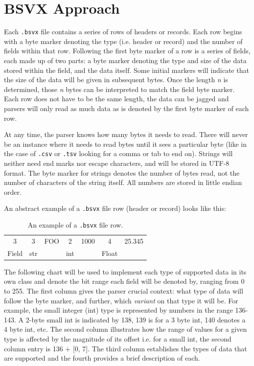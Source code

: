 \documentclass[10pt]{article}
\begin{document}
\section*{BSVX Approach}

Each \texttt{.bsvx} file contains a series of rows of headers or records.
Each row begins with a byte marker denoting the type (i.e. header or record) and the number of fields within that row.
Following the first byte marker of a row is a series of fields, each made up of two parts: a byte marker denoting the type and size of the data stored within the field, and the data itself.
Some initial markers will indicate that the size of the data will be given in subsequent bytes.
Once the length \textit{n} is determined, those \textit{n} bytes can be interpreted to match the field byte marker.
Each row does not have to be the same length, the data can be jagged and parsers will only read as much data as is denoted by the first byte marker of each row. 

\indent{}
At any time, the parser knows how many bytes it needs to read.
There will never be an instance where it needs to read bytes until it sees a particular byte (like in the case of \texttt{.csv} or \texttt{.tsv} looking for a comma or tab to end on).
Strings will neither need end marks nor escape characters, and will be stored in UTF-8 format.
The byte marker for strings denotes the number of bytes read, not the number of characters of the string itself.
All numbers are stored in little endian order.

\indent{}
An abstract example of a \texttt{.bsvx} file row (header or record) looks like this:

\begin{table}[htp]
\centering
\begin{tabular}{|c|c|c|c|c|c|c|}
\hline
3 & 3 & FOO & 2 & 1000 & 4 & 25.345 \\
Field & str &  & int &  & Float &  \\ \hline
\end{tabular}
\caption{An example of a \texttt{.bsvx} file row.}
\label{tab:bsvxApproach_example}
\end{table}

\indent{}
The following chart will be used to implement each type of supported data in its own class and denote the bit range each field will be denoted by, ranging from 0 to 255.
The first column gives the parser crucial context: what type of data will follow the byte marker, and further, which \textit{variant} on that type it will be.
For example, the small integer (int) type is represented by numbers in the range 136-143. 
A 2-byte small int is indicated by 138, 139 is for a 3 byte int, 140 denotes a 4 byte int, etc.
The second column illustrates how the range of values for a given type is affected by the magnitude of its offset i.e. for a small int, the second column entry is 136 + [0, 7].
The third column establishes the types of data that are supported and the fourth provides a brief description of each.
\end{document}
